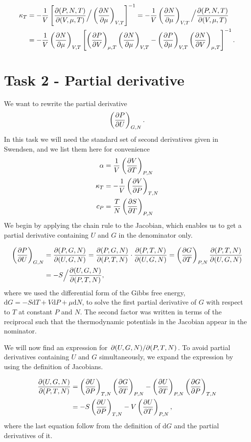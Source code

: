 \documentclass[reprint,english,notitlepage,aps,nobalancelastpage,nofootinbib]{revtex4-1}
\newcommand{\closed}[1]{\left(#1\right)}
\newcommand{\bracket}[1]{\left[#1\right]}
\newcommand{\kt}{\kappa_T}
\renewcommand{\cp}{c_P}
\renewcommand{\a}{\alpha}
\newcommand{\tmdv}[4]{\closed{\pdv{#1}{#2}}_{#3,#4}}
\newcommand{\jacobian}[2]{\pdv{(#1)}{(#2)}}
\renewcommand{\d}{\mathrm{d}}
\begin{document}
\begin{align*}
	\kt &= -\frac{1}{V}\bracket{\jacobian{P,N,T}{V,\mu,T} \Big/ \tmdv{N}{\mu}{V}{T}}^{-1}=-\frac{1}{V} \tmdv{N}{\mu}{V}{T} \Big/
	\jacobian{P,N,T}{V,\mu,T} \\
	&= -\frac{1}{V} \tmdv{N}{\mu}{V}{T} \bracket{\tmdv{P}{V}{\mu}{T}\tmdv{N}{\mu}{V}{T}-\tmdv{P}{\mu}{V}{T}\tmdv{N}{V}{\mu}{T}}^{-1}.
\end{align*}

\section*{\large Task 2 - Partial derivative}
We want to rewrite the partial derivative 
\begin{align*}
	\tmdv{P}{U}{G}{N}.
\end{align*}
In this task we will need the standard set of second derivatives given in Swendsen, and we list them here for convenience
\begin{align}
	\a &= \frac{1}{V} \tmdv{V}{T}{P}{N} \label{eq:alpha} \\ 
	\kt &= -\frac{1}{V} \tmdv{V}{P}{T}{N} \label{eq:kappa} \\ 
	\cp &= \frac{T}{N} \tmdv{S}{T}{P}{N} \label{eq:cp} \\ 
\end{align}
We begin by applying the chain rule to the Jacobian, which enables us to get a partial derivative containing $U$ and $G$ in the denominator only. 

\begin{align} 
	\tmdv{P}{U}{G}{N} &= \jacobian{P,G,N}{U,G,N} = \jacobian{P,G,N}{P,T,N}\cdot\jacobian{P,T,N}{U,G,N}= \tmdv{G}{T}{P}{N} \jacobian{P,T,N}{U,G,N} \nonumber \\
	&= -S \Big/\jacobian{U,G,N}{P,T,N}, \label{eq:pdv first expansion}
\end{align}
where we used the differential form of the Gibbs free energy, $\mathrm{d}G=-S\mathrm{d}T+V\mathrm{d}P+\mu\mathrm{d}N$, to solve the first partial derivative of $G$ with respect to $T$ at constant $P$ and $N$. The second factor was written in terms of the reciprocal such that the thermodynamic potentials in the Jacobian appear in the nominator. 

We will now find an expression for $\pdv*{(U,G,N)}{(P,T,N)}$. To avoid partial derivatives containing $U$ and $G$ simultaneously, we expand the expression by using the definition of Jacobians. 

\begin{align}
	\jacobian{U,G,N}{P,T,N} &= \tmdv{U}{P}{T}{N} \tmdv{G}{T}{P}{N} - \tmdv{U}{T}{P}{N}\tmdv{G}{P}{T}{N} \nonumber \\ 
	&= -S\tmdv{U}{P}{T}{N} - V \tmdv{U}{T}{P}{N}, \label{eq:d UGN_d PTN}
\end{align}
where the last equation follow from the definition of $\d G$ and the partial derivatives of it. 
\end{document}
